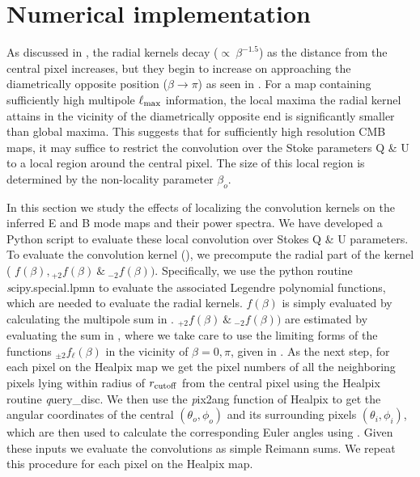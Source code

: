 \section{Numerical implementation} \label{sec:numerical_implementation}

As discussed in , the radial kernels decay ($\propto ~ \beta^{-1.5}$) as the distance from the central pixel increases, but they begin to increase on approaching the diametrically opposite position ($\beta \rightarrow \pi$)  as seen in . For a map containing sufficiently high multipole $\ell_{\rm max}$ information,  the local maxima the radial kernel attains in the vicinity of the diametrically opposite end is significantly smaller than global maxima. This suggests that for sufficiently high resolution CMB maps, it may suffice to restrict the convolution over the Stoke parameters Q \& U to a local region around the central pixel. The size of this local region is determined by the non-locality parameter $\beta_o$. 

In this section we study the effects of localizing the convolution kernels on the inferred E and B mode maps and their power spectra. We have developed a Python script to evaluate these local convolution over Stokes Q \& U parameters. To evaluate the convolution kernel (), we precompute the radial part of the kernel ( $f(\beta), {}_{+2}f(\beta) ~\&~ {}_{-2}f(\beta))$. Specifically, we use the python routine {\textit scipy.special.lpmn} to evaluate the associated Legendre polynomial functions, which are needed to evaluate the radial kernels. $f(\beta)$ is simply evaluated by calculating the multipole sum in . ${}_{+2}f(\beta) ~\&~ {}_{-2}f(\beta))$ are estimated by evaluating the sum in , where we take care to use the limiting forms of the functions ${}_{\pm 2}f_{\ell}(\beta)$ in the vicinity of $\beta=0,\pi$, given in . As the next step, for each pixel on the Healpix map we get the pixel numbers of all the neighboring pixels lying within radius of $r_{\rm cutoff}$ from the central pixel using the Healpix routine {\textit query\_disc}. We then use the {\textit pix2ang} function of Healpix to get the angular coordinates of the central $(\theta_o,\phi_o)$ and its surrounding pixels $(\theta_i,\phi_i)$, which are then used to calculate the corresponding Euler angles using . Given these  inputs we evaluate the convolutions as simple Reimann sums. We repeat this procedure for each pixel on the Healpix map.

